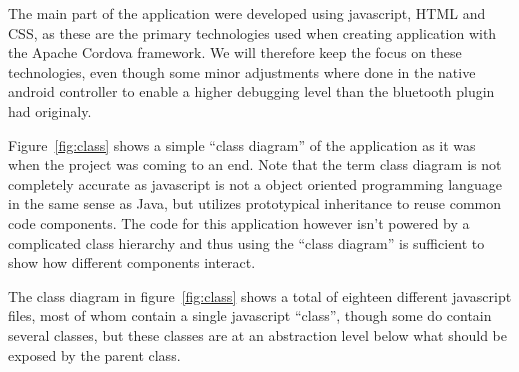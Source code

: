 \bigskip\noindent
The main part of the application were developed using javascript, HTML and CSS, as these are the primary technologies used when creating application with the Apache Cordova framework. We will therefore keep the focus on these technologies, even though some minor adjustments where done in the native android controller to enable a higher debugging level than the bluetooth plugin had originaly.

\bigskip\noindent
Figure~\ref{fig:class} shows a simple "`class diagram"' of the application as it was when the project was coming to an end. Note that the term class diagram is not completely accurate as javascript is not a object oriented programming language in the same sense as Java, but utilizes prototypical inheritance to reuse common code components. The code for this application however isn't powered by a complicated class hierarchy and thus using the "`class diagram"' is sufficient to show how different components interact.


\bigskip\noindent
The class diagram in figure~\ref{fig:class} shows a total of eighteen different javascript files, most of whom contain a single javascript "`class"', though some do contain several classes, but these classes are at an abstraction level below what should be exposed by the parent class. 

